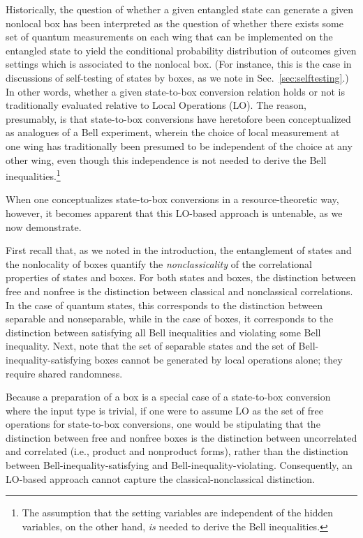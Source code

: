 \documentclass[prx,11pt,letterpaper,twocolumn,accepted=2023-11-27]{quantumarticle}
\theoremstyle{plain}
\theoremstyle{definition}
\begin{document}
 
Historically, the question of whether a given entangled state can generate a given nonlocal box has 
been interpreted as the question of whether there exists some set of quantum measurements on each wing that can be implemented on the entangled state to yield the conditional probability distribution of outcomes given settings which is associated to the nonlocal box.  (For instance, this is the case in discussions of self-testing of states by boxes, as we note in Sec.~\ref{sec:selftesting}.)  In other words, whether a given state-to-box conversion relation holds or not is traditionally evaluated relative to Local Operations (LO).
  The reason, presumably, is that state-to-box conversions have heretofore been conceptualized as analogues of a Bell experiment, wherein the choice of local measurement at one wing has traditionally been presumed to be independent of the choice at any other wing, even though this independence is not needed to derive the Bell inequalities.\footnote{The assumption that the setting variables are independent of the hidden variables, on the other hand, {\em is} needed to derive the Bell inequalities.}   
   
When one conceptualizes state-to-box conversions in a resource-theoretic way, however, it becomes apparent that this LO-based approach is untenable, as we now demonstrate.

  
First recall that, as we noted in the introduction, the entanglement of states and the nonlocality of boxes quantify the {\em nonclassicality} of the correlational properties of states and boxes.  For both states and boxes, the distinction between free and nonfree  is the distinction between classical and nonclassical correlations.  In the case of quantum states, this corresponds to the distinction between separable and nonseparable, while in the case of boxes, it corresponds to the distinction between satisfying all Bell inequalities and violating some Bell inequality.  
Next, note that the set of separable states and the set of Bell-inequality-satisfying boxes cannot be generated by local operations alone; they require shared randomness. 



Because a preparation of a box is a special case of 
a state-to-box conversion 
where the input type is trivial, if one were to assume LO as the set of free operations for state-to-box 
conversions, one would be stipulating that the distinction between free and nonfree boxes is the distinction between uncorrelated and correlated (i.e., product and nonproduct forms), rather than the distinction between Bell-inequality-satisfying and Bell-inequality-violating.  Consequently, an LO-based approach cannot capture the classical-nonclassical distinction. 
\end{document}
